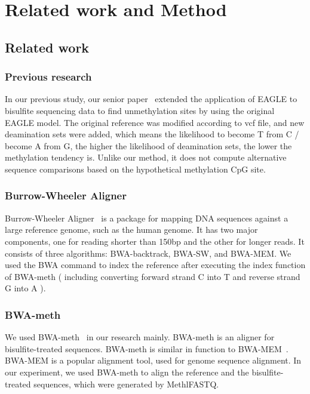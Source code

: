 \documentclass{PHlab-thesis}
\begin{document}
\chapter{Related work and Method}
\section{Related work}
\subsection{Previous research}
In our previous study, our senior paper~\cite{ni2021} extended the application of EAGLE to bisulfite sequencing data to find unmethylation sites by using the original EAGLE model. The original reference was modified according to vcf file, and new deamination sets were added, which means the likelihood to become T from C / become A from G, the higher the likelihood of deamination sets, the lower the methylation tendency is. Unlike our method, it does not compute alternative sequence comparisons based on the hypothetical methylation CpG site.
\subsection{Burrow-Wheeler Aligner}
Burrow-Wheeler Aligner~\cite{abuin2015bigbwa} is a package for mapping DNA sequences against a large reference genome, such as the human genome. It has two major components, one for reading shorter than 150bp and the other for longer reads. It consists of three algorithms: BWA-backtrack, BWA-SW, and BWA-MEM. We used the BWA command to index the reference after executing the index function of BWA-meth ( including converting forward strand C into T and reverse strand G into A ).
\subsection{BWA-meth}
We used BWA-meth~\cite{pedersen2014fast} in our research mainly. BWA-meth is an aligner for bisulfite-treated sequences. BWA-meth is similar in function to BWA-MEM~\cite{li2013aligning}. BWA-MEM is a popular alignment tool, used for genome sequence alignment. In our experiment, we used BWA-meth to align the reference and the bisulfite-treated sequences, which were generated by MethlFASTQ.
\end{document}

